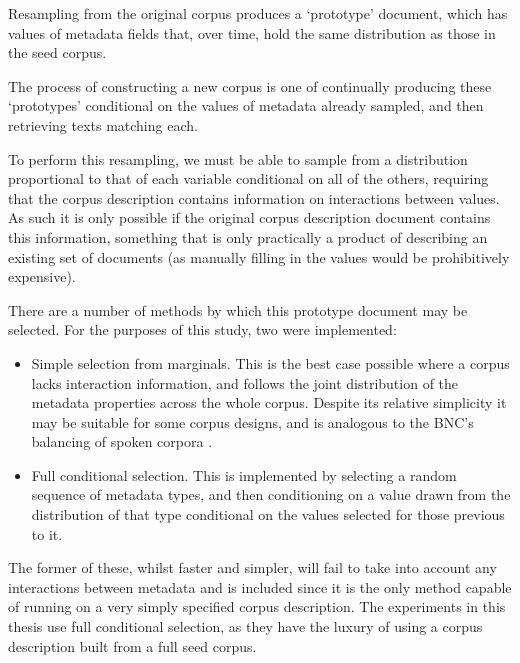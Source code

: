 Resampling from the original corpus produces a `prototype' document, which has values of metadata fields that, over time, hold the same distribution as those in the seed corpus.

The process of constructing a new corpus is one of continually producing these `prototypes' conditional on the values of metadata already sampled, and then retrieving texts matching each.

To perform this resampling, we must be able to sample from a distribution proportional to that of each variable conditional on all of the others, requiring that the corpus description contains information on interactions between values.  As such it is only possible if the original corpus description document contains this information, something that is only practically a product of describing an existing set of documents (as manually filling in the values would be prohibitively expensive).


There are a number of methods by which this prototype document may be selected.  For the purposes of this study, two were implemented:

\begin{itemize}
    \item Simple selection from marginals.  This is the best case possible where a corpus lacks interaction information, and follows the joint distribution of the metadata properties across the whole corpus.  Despite its relative simplicity it may be suitable for some corpus designs, and is analogous to the BNC's balancing of spoken corpora .
    \item Full conditional selection.  This is implemented by selecting a random sequence of metadata types, and then conditioning on a value drawn from the distribution of that type conditional on the values selected for those previous to it.
\end{itemize}


The former of these, whilst faster and simpler, will fail to take into account any interactions between metadata and is included since it is the only method capable of running on a very simply specified corpus description.  The experiments in this thesis use full conditional selection, as they have the luxury of using a corpus description built from a full seed corpus.



